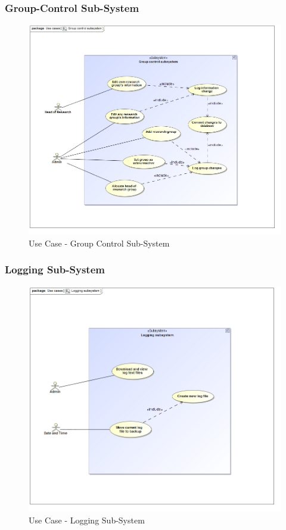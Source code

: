 \documentclass{article}
\begin{document}
			\cleardoublepage
			\subsubsection{Group-Control Sub-System}
			\begin{figure}[H]
				\includegraphics[width=\linewidth]{../Diagrams/Use Cases/Group control subsystem.jpg}
				\caption{Use Case - Group Control Sub-System}
			\end{figure}
			
			\cleardoublepage
			\subsubsection{Logging Sub-System}
			\begin{figure}[H]
				\includegraphics[width=\linewidth]{../Diagrams/Use Cases/Logging subsystem.jpg}
				\caption{Use Case - Logging Sub-System}
			\end{figure}
			
\end{document}
